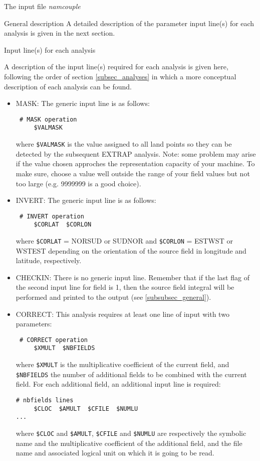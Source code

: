 \begin{subsection}{The input file {\it namcouple}}
\begin{subsubsection}{General description}
A detailed description of the parameter input line(s)  for each 
analysis is given in the next section.

\end{subsubsection}

\begin{subsubsection}{Input line(s) for each analysis}
\label{subsubsec_input}

A description of the input line(s) required for each analysis is given
here, following the order of section \ref{subsec_analyses} in which 
a more conceptual description of each analysis can be found.
\begin{itemize}
\item MASK: The generic input line is as follows:
\begin{verbatim}
 # MASK operation
     $VALMASK 
\end{verbatim}
where {\tt \$VALMASK} is the value assigned to all land
points so they can be detected by the subsequent EXTRAP
analysis. Note: some problem may arise if the value chosen approches
the representation capacity of your machine. To make sure, choose a 
value well outside the range of your field values but not too large
(e.g. 9999999 is a good choice).

\item INVERT: The generic input line is as follows:
\begin{verbatim}
 # INVERT operation
     $CORLAT  $CORLON 
\end{verbatim}
where {\tt \$CORLAT} = NORSUD or SUDNOR and {\tt \$CORLON} = ESTWST or
WSTEST depending on the orientation of the
source field in longitude and latitude, respectively.

\item CHECKIN: There is no generic input line. Remember that if the
last flag of the second input line for field is 1, then the source field
integral will be performed and printed to the output (see 
\ref{subsubsec_general}).

\item CORRECT: This analysis requires at least one line of input 
with two parameters:
\begin{verbatim}
 # CORRECT operation 
     $XMULT  $NBFIELDS
\end{verbatim}
where {\tt \$XMULT} is the multiplicative coefficient of the current field, 
and {\tt \$NBFIELDS}
the number of additional fields to be combined with the current field.
For each additional field, an additional input line is required:
\begin{verbatim}
# nbfields lines
     $CLOC  $AMULT  $CFILE  $NUMLU
...
\end{verbatim}
where {\tt \$CLOC} and {\tt \$AMULT}, {\tt \$CFILE} and {\tt \$NUMLU} are
respectively the symbolic name and the multiplicative coefficient of
the additional field, and the file name and associated logical unit 
on which it is going to be read.


\end{itemize}
\end{subsubsection}
\end{subsection}
